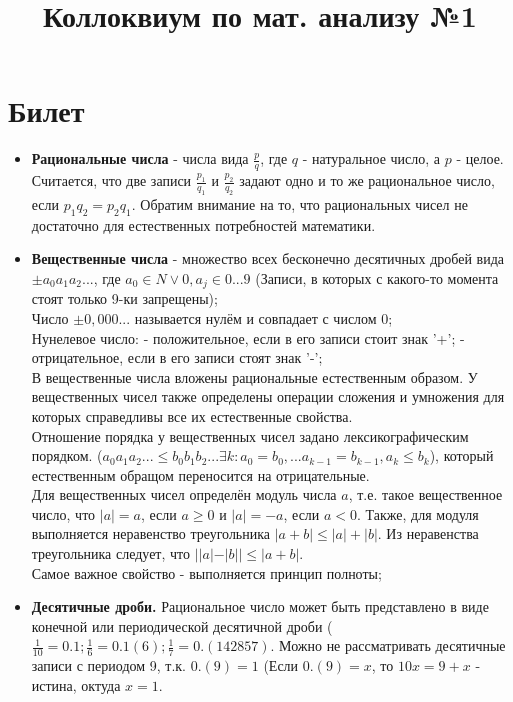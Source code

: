 \documentclass[12pt,a4paper]{article}
\title{Коллоквиум по мат. анализу №1}
\begin{document}
\maketitle
\section{Билет}
\begin{itemize}
\item \textbf{Рациональные числа} - числа вида $\frac{p}{q}$, где $q$ - натуральное число, а $p$ - целое. Считается, что две записи $\frac{p_1}{q_1}$ и  $\frac{p_2}{q_2}$ задают одно и то же рациональное число, если $p_1q_2=p_2q_1$. Обратим внимание на то, что рациональных чисел не достаточно для естественных потребностей математики.

\item \textbf{Вещественные числа} - множество всех бесконечно десятичных дробей вида $\pm a_0a_1a_2...$, где $a_0 \in N \vee {0}, a_j \in {0...9}$ (Записи, в которых с какого-то момента стоят только 9-ки запрещены); \\
Число $\pm 0,000...$ называется нулём и совпадает с числом 0;\\
Нунелевое число:
- положительное, если в его записи стоит знак '+';
- отрицательное, если в его записи стоят знак '-'; \\
В вещественные числа вложены рациональные естественным образом. У вещественных чисел также определены операции сложения и умножения для которых справедливы все их естественные свойства. \\
Отношение порядка у вещественных чисел задано лексикографическим порядком. ($a_0a_1a_2...\leq b_0b_1b_2... \exists k: a_0 = b_0, ... a_{k-1}=b_{k-1}, a_k \leq b_k$), который естественным обращом переносится на отрицательные. \\
Для вещественных чисел определён модуль числа $a$, т.е. такое вещественное число, что $|a| = a$, если $a \geq 0$ и $|a| = -a$, если $a < 0$. Также, для модуля выполняется неравенство треугольника $|a+b| \leq |a| + |b|$. Из неравенства треугольника следует, что $||a|-|b|| \leq |a+b|$. \\
Самое важное свойство - выполняется принцип полноты;

\item \textbf{Десятичные дроби.} Рациональное число может быть представлено в виде конечной или периодической десятичной дроби ($\frac{1}{10} = 0.1; \frac{1}{6} = 0.1(6); \frac{1}{7} = 0.(142857)$. Можно не рассматривать десятичные записи с периодом 9, т.к. $0.(9) = 1$ (Если $0.(9) = x$, то $10x=9+x$ - истина, октуда $x = 1$.


\end{itemize}
\end{document}
